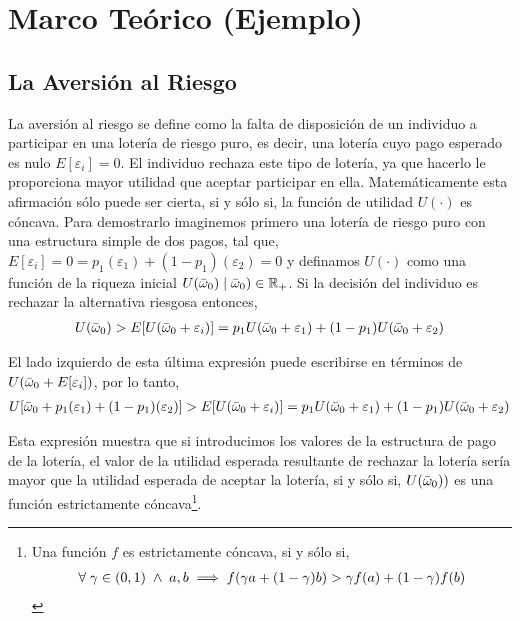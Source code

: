 \section{Marco Teórico (Ejemplo)}

\subsection{La Aversión al Riesgo}

La aversión al riesgo se define como la falta de disposición de un individuo a participar en una lotería de riesgo puro, es decir, una lotería cuyo pago esperado es nulo $E[\varepsilon_{i}]=0$. El individuo rechaza este tipo de lotería, ya que hacerlo le proporciona mayor utilidad que aceptar participar en ella. Matemáticamente esta afirmación sólo puede ser cierta, si y sólo si, la función de utilidad $U(\cdot)$ es cóncava. Para demostrarlo imaginemos primero una lotería de riesgo puro con una estructura simple de dos pagos, tal que, $E[\varepsilon_{i}]=0=p_1(\varepsilon_1)+(1-p_1)(\varepsilon_2)=0$ y definamos $U(\cdot)$ como una función de la riqueza inicial $U(\Bar{\omega}_{0})\;|\;\Bar{\omega}_{0})\in{\mathbb{R}_+}$. Si la decisión del individuo es rechazar la alternativa riesgosa entonces,
\begin{equation}
\begin{aligned}
U(\Bar{\omega}_{0})>E[U(\Bar{\omega}_{0}+\varepsilon_{i})]=p_1U(\Bar{\omega}_{0}+\varepsilon_1)+(1-p_1)U(\Bar{\omega}_{0}+\varepsilon_2)
\end{aligned}
\end{equation}

El lado izquierdo de esta última expresión puede escribirse en términos de $U(\Bar{\omega}_{0}+E[\varepsilon_{i}])$, por lo tanto,
\begin{equation}
\begin{aligned}
U[\Bar{\omega}_{0}+p_1(\varepsilon_{1})+(1-p_{1})(\varepsilon_{2})]>E[U(\Bar{\omega}_{0}+\varepsilon_{i})]=p_1U(\Bar{\omega}_{0}+\varepsilon_1)+(1-p_1)U(\Bar{\omega}_{0}+\varepsilon_2)
\end{aligned}
\end{equation}

Esta expresión muestra que si introducimos los valores de la estructura de pago de la lotería, el valor de la utilidad esperada resultante de rechazar la lotería sería mayor que la utilidad esperada de aceptar la lotería, si y sólo si, $U(\Bar{\omega}_{0}))$ es una función estrictamente cóncava\footnote{Una función $f$ es estrictamente cóncava, si y sólo si,
\begin{equation*}
\begin{aligned}
\forall\;{\gamma\in{(0,1)}}\;\wedge\;a,b\implies{f(\gamma{a}+(1-\gamma)b)}>\gamma{f(a)+(1-\gamma)f(b)}
\end{aligned}
\end{equation*}}. 

